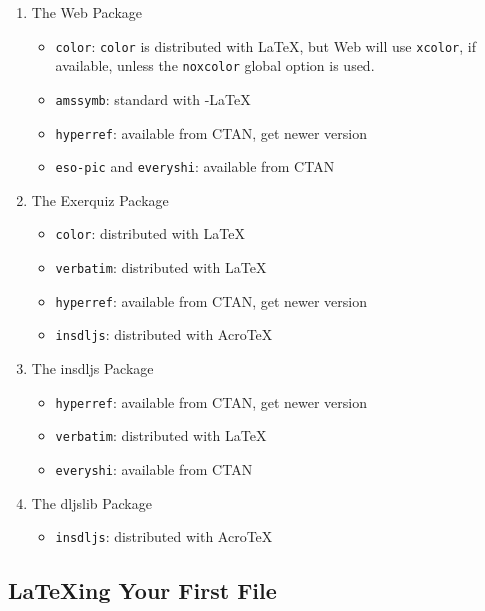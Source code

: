 \documentclass{article}
\def\AcroT{Acro\!\TeX}\def\cAcroT{\textcolor{blue}{\AcroT}}
\def\Web{\textsf{Web}}
\def\AmS{{\protect\usefont{OMS}{cmsy}{m}{n}%
  A\kern-.1667em\lower.5ex\hbox{M}\kern-.125emS}}
\def\amslatex/{{\protect\AmS-\protect\LaTeX}}
\begin{document}
\begin{enumerate}
    \item The \textsf{Web} Package
        \begin{itemize}
            \item \texttt{color}: \texttt{color} is distributed with \LaTeX, but {\Web}
            will use \texttt{xcolor}, if available, unless the
            \texttt{noxcolor} global option is used.
            \item \texttt{amssymb}: standard with \amslatex/
            \item \texttt{hyperref}: available from CTAN, get newer version
            \item \texttt{eso-pic} and \texttt{everyshi}: available from CTAN
        \end{itemize}
    \item The \textsf{Exerquiz} Package
        \begin{itemize}
            \item \texttt{color}: distributed with \LaTeX
            \item \texttt{verbatim}: distributed with \LaTeX
            \item \texttt{hyperref}: available from CTAN, get newer version
            \item \texttt{insdljs}: distributed with \AcroT
        \end{itemize}
    \item The \textsf{insdljs} Package
        \begin{itemize}
            \item \texttt{hyperref}: available from CTAN, get newer version
            \item \texttt{verbatim}: distributed with \LaTeX
            \item \texttt{everyshi}: available from CTAN
        \end{itemize}
    \item The \textsf{dljslib} Package
        \begin{itemize}
            \item \texttt{insdljs}: distributed with \AcroT
        \end{itemize}
\end{enumerate}

\subsection{\LaTeX ing Your First File}
\end{document}
